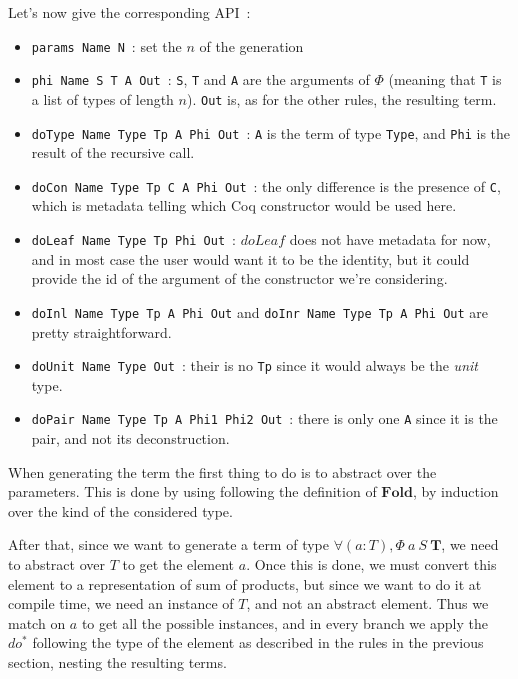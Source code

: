 \documentclass{article}
\newcommand{\fld}{\mathbf{Fold}}
\begin{document}
Let's now give the corresponding API~:\begin{itemize}
    \item \texttt{params Name N}~: set the $n$ of the generation
    \item \texttt{phi Name S T A Out}~: \texttt{S}, \texttt{T} and \texttt{A}
        are the arguments of $\Phi$ (meaning that \texttt{T} is a list of types
        of length $n$). \texttt{Out} is, as for the other rules, the resulting
        term.
    \item \texttt{doType Name Type Tp A Phi Out}~: \texttt{A} is the term
        of type \texttt{Type}, and \texttt{Phi} is the result of the recursive
        call.
    \item \texttt{doCon Name Type Tp C A Phi Out}~: the only difference is
        the presence of \texttt{C}, which is metadata telling which Coq
        constructor would be used here.
    \item \texttt{doLeaf Name Type Tp Phi Out}~: $doLeaf$ does not have metadata
        for now, and in most case the user would want it to be the identity,
        but it could provide the id of the argument of the constructor we're
        considering.
    \item \texttt{doInl Name Type Tp A Phi Out} and \texttt{doInr Name Type Tp A Phi Out}
        are pretty straightforward.
    \item \texttt{doUnit Name Type Out}~: their is no \texttt{Tp} since it would
        always be the \emph{unit} type.
    \item \texttt{doPair Name Type Tp A Phi1 Phi2 Out}~: there is only one \texttt{A}
        since it is the pair, and not its deconstruction.
\end{itemize}

When generating the term the first thing to do is to abstract over the parameters.
This is done by using following the definition of $\fld$, by induction over the
kind of the considered type.

After that, since we want to generate a term of type $\forall (a : T), \Phi\ a\ S\ \mathbf{T}$,
we need to abstract over $T$ to get the element $a$. Once this is done, we must
convert this element to a representation of sum of products, but since we want
to do it at compile time, we need an instance of $T$, and not an abstract element.
Thus we match on $a$ to get all the possible instances, and in every branch we
apply the $do^*$ following the type of the element as described in the rules in
the previous section, nesting the resulting terms.
\end{document}
